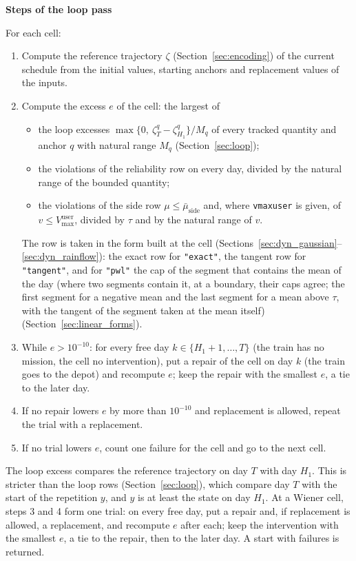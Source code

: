 \documentclass[11pt,a4paper]{article}
\theoremstyle{plain}
\theoremstyle{definition}
\newcommand{\blockhead}[1]{\par\noindent\textbf{#1}\par\nobreak}
\renewcommand{\_}{\textunderscore\allowbreak{}}
\begin{document}
\blockhead{Steps of the loop pass}
For each cell:
\begin{enumerate}[nosep,label=\arabic*.]
  \item Compute the reference trajectory $\zeta$ (Section~\ref{sec:encoding}) of the current schedule from the initial values, starting anchors and replacement values of the inputs.
  \item Compute the excess $e$ of the cell: the largest of
    \begin{itemize}[nosep]
      \item the loop excesses $\max\{0,\ \zeta^{q}_{T} - \zeta^{q}_{H_1}\}/M_q$ of every tracked quantity and anchor $q$ with natural range $M_q$ (Section~\ref{sec:loop});
      \item the violations of the reliability row on every day, divided by the natural range of the bounded quantity;
      \item the violations of the side row $\mu \le \bar\mu_{\mathrm{side}}$ and, where \texttt{v\_max\_user} is given, of $v \le V^{\mathrm{user}}_{\max}$, divided by $\tau$ and by the natural range of $v$.
    \end{itemize}
    The row is taken in the form built at the cell (Sections~\ref{sec:dyn_gaussian}--\ref{sec:dyn_rainflow}): the exact row for \texttt{"exact"}, the tangent row for \texttt{"tangent"}, and for \texttt{"pwl"} the cap of the segment that contains the mean of the day (where two segments contain it, at a boundary, their caps agree; the first segment for a negative mean and the last segment for a mean above $\tau$, with the tangent of the segment taken at the mean itself) (Section~\ref{sec:linear_forms}).
  \item While $e > 10^{-10}$: for every free day $k \in \{H_1+1,\ldots,T\}$ (the train has no mission, the cell no intervention), put a repair of the cell on day $k$ (the train goes to the depot) and recompute $e$; keep the repair with the smallest $e$, a tie to the later day.
  \item If no repair lowers $e$ by more than $10^{-10}$ and replacement is allowed, repeat the trial with a replacement.
  \item If no trial lowers $e$, count one failure for the cell and go to the next cell.
\end{enumerate}
The loop excess compares the reference trajectory on day $T$ with day $H_1$. This is stricter than the loop rows (Section~\ref{sec:loop}), which compare day $T$ with the start of the repetition $y$, and $y$ is at least the state on day $H_1$.
At a Wiener cell, steps 3 and 4 form one trial: on every free day, put a repair and, if replacement is allowed, a replacement, and recompute $e$ after each; keep the intervention with the smallest $e$, a tie to the repair, then to the later day.
A start with failures is returned.
\end{document}
